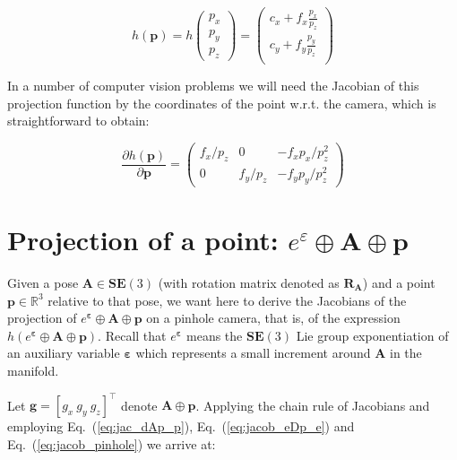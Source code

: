 \documentclass[a4paper,11pt]{report}
\newcommand{\E}{{\bm{\varepsilon}}}
\newcommand{\A}{{\mathbf{A}}}
\begin{document}
\begin{equation}
h(\mathbf{p}) =
h\left(
\begin{array}{c}
 p_x \\ p_y \\p_z
\end{array}
\right) =
\left(
\begin{array}{c}
 c_x + f_x  \frac{p_x}{p_z} \\
 c_y + f_y  \frac{p_y}{p_z} \\
\end{array}
\right)
\end{equation}

In a number of computer vision problems we will need the Jacobian of this
projection function by the coordinates of the point w.r.t. the camera, which
is straightforward to obtain:

\begin{equation}
\label{eq:jacob_pinhole}
\frac{\partial h(\mathbf{p})}{\partial \mathbf{p}} =
\left(
\begin{array}{ccc}
 f_x/p_z  &    0    &  -f_x p_x/p_z^2   \\
 0 & f_y/p_z  &  -f_y p_y/ p_z^2
\end{array}
\right)
\end{equation}


\section{Projection of a point: $e^\varepsilon \oplus \mathbf{A} \oplus \mathbf{p}$}

Given a pose $\mathbf{A} \in \mathbf{SE}(3)$
(with rotation matrix denoted as $\mathbf{R_A}$)
and a point
$\mathbf{p} \in \mathbb{R}^3$
relative to that pose, we want here to derive the Jacobians of
the projection of $e^\E \oplus \A \oplus \mathbf{p}$ on a pinhole camera, that is,
of the expression $h(e^\E \oplus \A \oplus \mathbf{p})$.
Recall that $e^\E$ means the $\mathbf{SE}(3)$ Lie group exponentiation
of an auxiliary variable $\E$ which represents a small increment around $\A$ in the manifold.

Let $\mathbf{g}=[g_x ~ g_y ~ g_z]^\top$ denote $\mathbf{A} \oplus \mathbf{p}$.
Applying the chain rule of Jacobians and employing Eq.~(\ref{eq:jac_dAp_p}),
Eq.~(\ref{eq:jacob_eDp_e})
and  Eq.~(\ref{eq:jacob_pinhole})
we arrive at:
\end{document}
